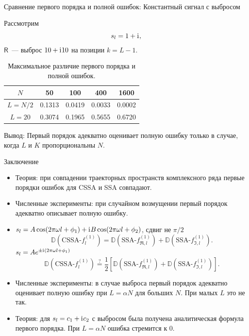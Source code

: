 \documentclass[ucs, notheorems, handout]{beamer}
\newcommand{\tX}[1]{\mathsf{#1}}
\newcommand{\iu}{\mathrm{i}\mkern1mu}
\begin{document}
\begin{frame}{Сравнение первого порядка и полной ошибок: Константный сигнал с выбросом}

Рассмотрим
$$s_l = 1 + \iu,$$
$\tX{R}$~--- выброс $10 + \iu 10$ на позиции $k = L - 1$.

\begin{table}[H]
	\begin{center}
		\caption{Максимальное различие первого порядка и полной ошибок.}
		\label{tab:const_outl}
		\begin{tabular}{|c|c|c|c|c|}
			\hline
			$N$	& 50 & 100 & 400 & 1600 \\
			\hline
			$L = N / 2$ & 0.1313  & 0.0419  & 0.0033 & 0.0002 \\
			\hline
			$L = 20$ & 0.3074  & 0.1965  & 0.5655 & 0.6720 \\
			\hline
		\end{tabular}
	\end{center}
\end{table}

\alert{Вывод:} Первый порядок адекватно оценивает полную ошибку только в случае, когда $L$ и $K$ пропорциональны $N$.

\end{frame}

\begin{frame}{Заключение}
    \begin{itemize}
        \item Теория: при совпадении траекторных пространств комплексного ряда первые порядки ошибок для CSSA и SSA совпадают.
        \item Численные эксперименты: при случайном возмущении первый порядок адекватно описывает полную ошибку.
        \item $s_l = A\cos(2 \pi\omega l + \phi_1) + \iu B\cos(2 \pi\omega l + \phi_2)$, сдвиг не $\pi / 2$
        $$\mathbb{D}(\text{CSSA-}f^{(1)}_l) = \mathbb{D}(\text{SSA-}f^{(1)}_{\Re, l}) + \mathbb{D}(\text{SSA-}f^{(1)}_{\Im, l}).$$
        $s_l = Ae^{\pm \iu(2 \pi\omega l + \phi_1)}$
        $$\mathbb{D}(\text{CSSA-}f^{(1)}_l) \stackrel{?}{=} \frac{1}{2}[\mathbb{D}(\text{SSA-}f^{(1)}_{\Re, l}) + \mathbb{D}(\text{SSA-}f^{(1)}_{\Im, l})].$$
        \item Численные эксперименты: в случае выброса первый порядок адекватно оценивает полную ошибку при $L = \alpha N$ для больших $N$. При малых $L$ это не так.
        \item Теория: для $s_l = c_1 + \iu c_2$ с выбросом была получена аналитическая формула первого порядка. При $L = \alpha N$ ошибка стремится к $0$.
    \end{itemize}
\end{frame}
\end{document}
